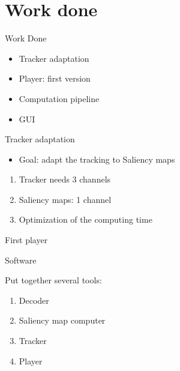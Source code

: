 \documentclass[t,14pt]{beamer}
\begin{document}
\section[Work Done]{Work done}
\begin{frame}{Work Done}
\vspace{5mm}
\begin{itemize}[<+->]
\item Tracker adaptation
\item Player: first version
\item Computation pipeline
\item GUI
\end{itemize}
\end{frame}

\begin{frame}{Tracker adaptation}
\vspace*{5mm}
\begin{itemize}[<+->]
\item Goal: adapt the tracking to Saliency maps
\end{itemize}
\begin{enumerate}[<+->]
\item Tracker needs 3 channels
\item Saliency maps: 1 channel
\item Optimization of the computing time
\end{enumerate}
\end{frame}

\begin{frame}{First player}
\vspace*{5mm}
\end{frame}

\begin{frame}{Software}
\vspace*{5mm}
\begin{center}
Put together several tools:
\end{center}
\begin{enumerate}
\item Decoder
\item Saliency map computer
\item Tracker
\item Player
\end{enumerate}
\end{frame}
\end{document}
